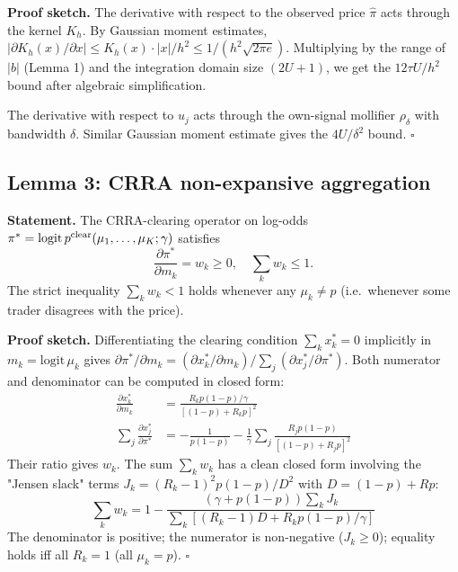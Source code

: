 \documentclass[11pt]{article}
\newcommand{\1}{\mathbf{1}}
\begin{document}
\textbf{Proof sketch.} The derivative with respect to the observed price
$\hat\pi$ acts through the kernel $K_h$.  By Gaussian moment estimates,
$|\partial K_h(x)/\partial x| \le K_h(x) \cdot |x|/h^2 \le 1/(h^2 \sqrt{2 \pi e})$.
Multiplying by the range of $|b|$ (Lemma 1) and the integration domain
size $(2U+1)$, we get the $12 \tau U / h^2$ bound after algebraic
simplification.

The derivative with respect to $u_j$ acts through the own-signal
mollifier $\rho_\delta$ with bandwidth $\delta$.  Similar Gaussian
moment estimate gives the $4 U / \delta^2$ bound.  $\square$

\subsection{Lemma 3: CRRA non-expansive aggregation}

\textbf{Statement.} The CRRA-clearing operator on log-odds
$\pi^* = \mathrm{logit}\, p^{\rm clear}(\mu_1, \ldots, \mu_K; \gamma)$
satisfies
\begin{equation}
\frac{\partial \pi^*}{\partial m_k} = w_k \ge 0, \quad \sum_k w_k \le 1.
\end{equation}
The strict inequality $\sum_k w_k < 1$ holds whenever any $\mu_k \ne p$
(i.e.\ whenever some trader disagrees with the price).

\textbf{Proof sketch.} Differentiating the clearing condition $\sum_k
x_k^* = 0$ implicitly in $m_k = \mathrm{logit}\,\mu_k$ gives
$\partial \pi^*/\partial m_k = (\partial x_k^*/\partial m_k) / \sum_j (\partial x_j^*/\partial \pi^*)$.
Both numerator and denominator can be computed in closed form:
\begin{align}
\frac{\partial x_k^*}{\partial m_k} &= \frac{R_k p (1-p) / \gamma}{[(1-p) + R_k p]^2} \\
\sum_j \frac{\partial x_j^*}{\partial \pi^*} &= -\frac{1}{p(1-p)} - \frac{1}{\gamma} \sum_j \frac{R_j p(1-p)}{[(1-p) + R_j p]^2}
\end{align}
Their ratio gives $w_k$.  The sum $\sum_k w_k$ has a clean closed
form involving the "Jensen slack" terms $J_k = (R_k - 1)^2 p (1-p) / D^2$
with $D = (1-p) + R p$:
\begin{equation}
\sum_k w_k = 1 - \frac{(\gamma + p(1-p)) \sum_k J_k}{\sum_k [(R_k - 1) D + R_k p(1-p)/\gamma]}
\end{equation}
The denominator is positive; the numerator is non-negative
($J_k \ge 0$); equality holds iff all $R_k = 1$ (all $\mu_k = p$). $\square$
\end{document}
